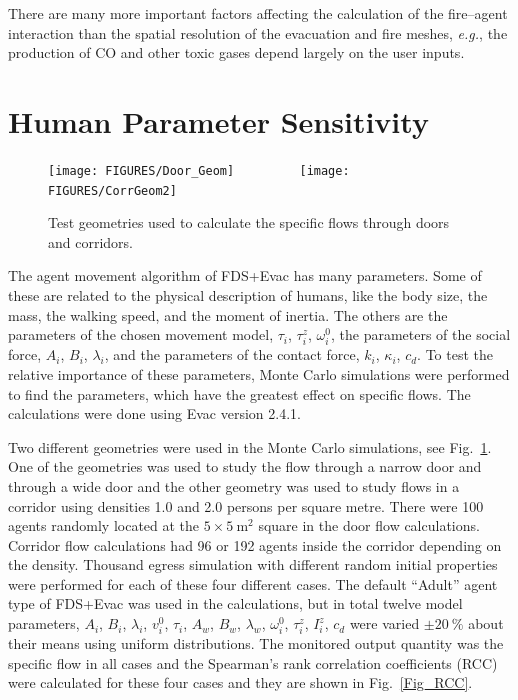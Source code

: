 \documentclass[12pt,a4paper,final,twoside]{stylevk}
\begin{document}
There are many more important factors affecting the calculation of the
fire--agent interaction than the spatial resolution of the evacuation
and fire meshes, \emph{e.g.}, the production of CO and other toxic
gases depend largely on the user inputs.


\section{Human Parameter Sensitivity}\label{Sec_HumParSensi}

%
\begin{figure}[!tb]
  \centerline{ \texttt{[image: FIGURES/Door\_Geom]} ~~~~~~~~   
    \texttt{[image: FIGURES/CorrGeom2]} }
  \caption{Test geometries used to calculate the specific flows through
    doors and corridors.\protect\hspace{200mm}}\label{Fig_Geoms}
\end{figure}
%

\noindent The agent movement algorithm of FDS+Evac has many
parameters.  Some of these are related to the physical description of
humans, like the body size, the mass, the walking speed, and the
moment of inertia.  The others are the parameters of the chosen
movement model, $\tau_i$, $\tau^z_i$, $\omega^0_i$, the parameters of
the social force, $A_i$, $B_i$, $\lambda_i$, and the parameters of the
contact force, $k_i$, $\kappa_i$, $c_d$.  To test the relative
importance of these parameters, Monte Carlo simulations were performed
to find the parameters, which have the greatest effect on specific
flows.  The calculations were done using Evac version 2.4.1.


Two different geometries were used in the Monte Carlo simulations, see
Fig.~\ref{Fig_Geoms}. One of the geometries was used to study the
flow through a narrow door and through a wide door and the other
geometry was used to study flows in a corridor using densities 1.0 and
2.0 persons per square metre.  There were 100 agents randomly located
at the $5 \times 5 ~\mathrm{ \textrm{m}^\textrm{2} } $ square in the
door flow calculations.  Corridor flow calculations had 96 or 192
agents inside the corridor depending on the density.  Thousand egress
simulation with different random initial properties were performed for
each of these four different cases.  The default ``Adult'' agent type
of FDS+Evac was used in the calculations, but in total twelve model
parameters, $A_i$, $B_i$, $\lambda_i$, $v^0_i$, $\tau_i$, $A_w$,
$B_w$, $\lambda_w$, $\omega^0_i$, $\tau^z_i$, $I^z_{i}$, $c_d$ were
varied $\pm 20~\%$ about their means using uniform distributions.  The
monitored output quantity was the specific flow in all cases and the
Spearman's rank correlation coefficients (RCC) were calculated for
these four cases and they are shown in Fig.~\ref{Fig_RCC}.
\end{document}

